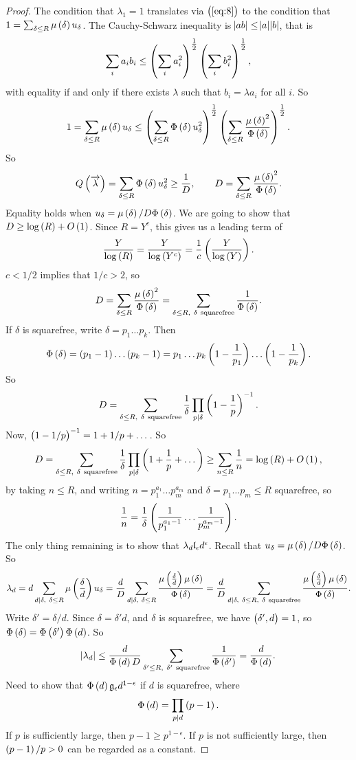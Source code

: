 \begin{proof}
The condition that $ \lambda_1 = 1 $ translates via $ \br{\ref{eq:8}} $ to the condition that $ 1 = \sum_{\delta \le R} \mu\br{\delta}u_\delta $. The Cauchy-Schwarz inequality is $ \abs{ab} \le \abs{a}\abs{b} $, that is
$$ \sum_i a_ib_i \le \br{\sum_i a_i^2}^{\tfrac{1}{2}}\br{\sum_i b_i^2}^{\tfrac{1}{2}}, $$
with equality if and only if there exists $ \lambda $ such that $ b_i = \lambda a_i $ for all $ i $. So
$$ 1 = \sum_{\delta \le R} \mu\br{\delta}u_\delta \le \br{\sum_{\delta \le R}\Phi\br{\delta}u_\delta^2}^{\tfrac{1}{2}}\br{\sum_{\delta \le R}\dfrac{\mu\br{\delta}^2}{\Phi\br{\delta}}}^{\tfrac{1}{2}}. $$
So
$$ Q\br{\overrightarrow{\lambda}} = \sum_{\delta \le R} \Phi\br{\delta}u_\delta^2 \ge \dfrac{1}{D}, \qquad D = \sum_{\delta \le R} \dfrac{\mu\br{\delta}^2}{\Phi\br{\delta}}. $$
Equality holds when $ u_\delta = \mu\br{\delta} / D\Phi\br{\delta} $. We are going to show that $ D \ge \log\br{R} + O\br{1} $. Since $ R = Y^c $, this gives us a leading term of
$$ \dfrac{Y}{\log\br{R}} = \dfrac{Y}{\log\br{Y^c}} = \dfrac{1}{c}\br{\dfrac{Y}{\log\br{Y}}}. $$
$ c < 1 / 2 $ implies that $ 1 / c > 2 $, so
$$ D = \sum_{\delta \le R} \dfrac{\mu\br{\delta}^2}{\Phi\br{\delta}} = \sum_{\delta \le R, \ \delta \ \text{squarefree}} \dfrac{1}{\Phi\br{\delta}}. $$
If $ \delta $ is squarefree, write $ \delta = p_1 \dots p_k $. Then
$$ \Phi\br{\delta} = \br{p_1 - 1} \dots \br{p_k - 1} = p_1 \dots p_k\br{1 - \dfrac{1}{p_1}} \dots \br{1 - \dfrac{1}{p_k}}. $$
So
$$ D = \sum_{\delta \le R, \ \delta \ \text{squarefree}} \dfrac{1}{\delta}\prod_{p \mid \delta} \br{1 - \dfrac{1}{p}}^{-1}. $$
Now, $ \br{1 - 1 / p}^{-1} = 1 + 1 / p + \dots $. So
$$ D = \sum_{\delta \le R, \ \delta \ \text{squarefree}} \dfrac{1}{\delta}\prod_{p \mid \delta} \br{1 + \dfrac{1}{p} + \dots} \ge \sum_{n \le R} \dfrac{1}{n} = \log\br{R} + O\br{1}, $$
by taking $ n \le R $, and writing $ n = p_1^{a_1} \dots p_m^{a_m} $ and $ \delta = p_1 \dots p_m \le R $ squarefree, so
$$ \dfrac{1}{n} = \dfrac{1}{\delta}\br{\dfrac{1}{p_1^{a_1 - 1}} \dots \dfrac{1}{p_m^{a_m - 1}}}. $$
The only thing remaining is to show that $ \lambda_d \l_\epsilon d^\epsilon $. Recall that $ u_\delta = \mu\br{\delta} / D\Phi\br{\delta} $. So
$$ \lambda_d = d\sum_{d \mid \delta, \ \delta \le R} \mu\br{\dfrac{\delta}{d}}u_\delta = \dfrac{d}{D}\sum_{d \mid \delta, \ \delta \le R} \dfrac{\mu\br{\tfrac{\delta}{d}}\mu\br{\delta}}{\Phi\br{\delta}} = \dfrac{d}{D}\sum_{d \mid \delta, \ \delta \le R, \ \delta \ \text{squarefree}} \dfrac{\mu\br{\tfrac{\delta}{d}}\mu\br{\delta}}{\Phi\br{\delta}}. $$
Write $ \delta' = \delta / d $. Since $ \delta = \delta'd $, and $ \delta $ is squarefree, we have $ \br{\delta', d} = 1 $, so $ \Phi\br{\delta} = \Phi\br{\delta'}\Phi\br{d} $. So
$$ \abs{\lambda_d} \le \dfrac{d}{\Phi\br{d}D}\sum_{\delta' \le R, \ \delta' \ \text{squarefree}} \dfrac{1}{\Phi\br{\delta'}} = \dfrac{d}{\Phi\br{d}}. $$
Need to show that $ \Phi\br{d} \g_\epsilon d^{1 - \epsilon} $ if $ d $ is squarefree, where
$$ \Phi\br{d} = \prod_{p \mid d} \br{p - 1}. $$
If $ p $ is sufficiently large, then $ p - 1 \ge p^{1 - \epsilon} $. If $ p $ is not sufficiently large, then $ \br{p - 1} / p > 0 $ can be regarded as a constant.
\end{proof}


